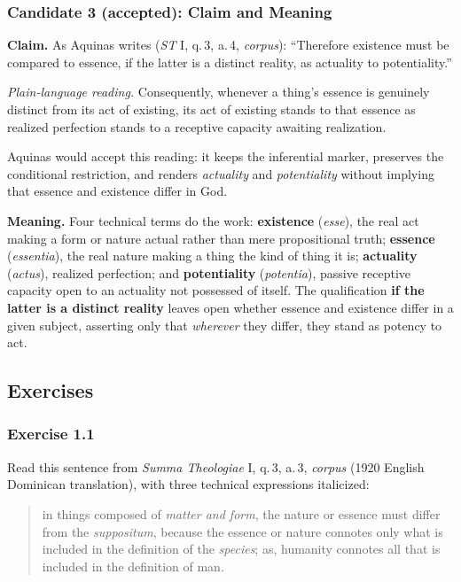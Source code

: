 \subsubsection*{Candidate 3 (accepted): Claim and Meaning}
\textbf{Claim.} As Aquinas writes (\emph{ST} I, q.\,3, a.\,4, \emph{corpus}): ``Therefore existence must be compared to essence, if the latter is a distinct reality, as actuality to potentiality.''

\emph{Plain-language reading.} Consequently, whenever a thing's essence is genuinely distinct from its act of existing, its act of existing stands to that essence as realized perfection stands to a receptive capacity awaiting realization.

Aquinas would accept this reading: it keeps the inferential marker, preserves the conditional restriction, and renders \emph{actuality} and \emph{potentiality} without implying that essence and existence differ in God.

\textbf{Meaning.} Four technical terms do the work: \textbf{existence} (\emph{esse}), the real act making a form or nature actual rather than mere propositional truth; \textbf{essence} (\emph{essentia}), the real nature making a thing the kind of thing it is; \textbf{actuality} (\emph{actus}), realized perfection; and \textbf{potentiality} (\emph{potentia}), passive receptive capacity open to an actuality not possessed of itself. The qualification \textbf{if the latter is a distinct reality} leaves open whether essence and existence differ in a given subject, asserting only that \emph{wherever} they differ, they stand as potency to act.

\subsection{Exercises}

\subsubsection*{Exercise 1.1}
Read this sentence from \emph{Summa Theologiae} I, q.\,3, a.\,3, \emph{corpus} (1920 English Dominican translation), with three technical expressions italicized:

\begin{quote}
in things composed of \emph{matter and form}, the nature or essence must differ from the \emph{suppositum}, because the essence or nature connotes only what is included in the definition of the \emph{species}; as, humanity connotes all that is included in the definition of man.
\end{quote}

